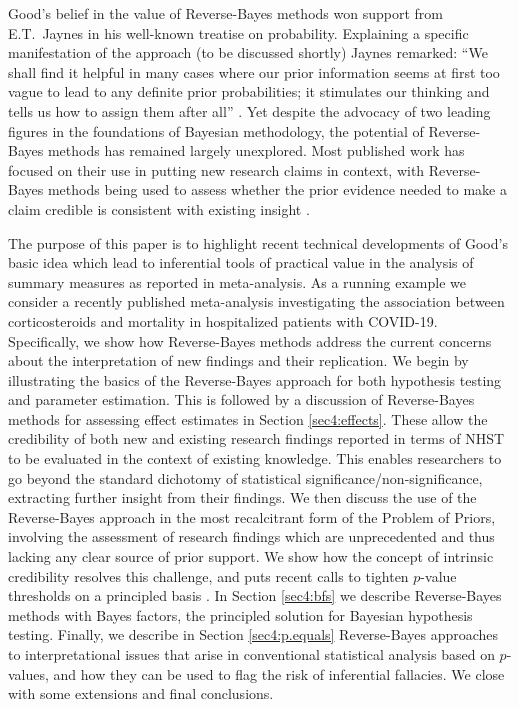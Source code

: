 Good's belief in the value of Reverse-Bayes methods won support from E.T.~Jaynes
in his well-known treatise on probability. Explaining a specific manifestation
of the approach (to be discussed shortly) Jaynes remarked: ``We shall find it
helpful in many cases where our prior information seems at first too vague to
lead to any definite prior probabilities; it stimulates our thinking and tells
us how to assign them after all'' \citep[p. 126]{Jaynes2003}. Yet despite the
advocacy of two leading figures in the foundations of Bayesian methodology, the
potential of Reverse-Bayes methods has remained largely unexplored. Most
published work has focused on their use in putting new research claims in
context, with Reverse-Bayes methods being used to assess whether the prior
evidence needed to make a claim credible is consistent with existing insight
\citep{Carlin1996,Matthews2001a,Matthews2001b,Spiegelhalter2004,Greenland2006,Greenland2011,Held2013,Colquhoun2017,Colquhoun2019,Held2019a,Held2020,Pawel2020b,
  Best2021}.


The purpose of this paper is to highlight recent technical developments of
Good's basic idea which lead to inferential tools of practical value in the
analysis of summary measures as reported in meta-analysis. As a running example
we consider a recently published meta-analysis investigating the association
between corticosteroids and mortality in hospitalized patients with COVID-19.
Specifically, we show how Reverse-Bayes methods address the current concerns
about the interpretation of new findings and their replication. We begin by
illustrating the basics of the Reverse-Bayes approach for both hypothesis
testing and parameter estimation. This is followed by a discussion of
Reverse-Bayes methods for assessing effect estimates in Section
\ref{sec4:effects}. These allow the credibility of both new and existing research
findings reported in terms of NHST to be evaluated in the context of existing
knowledge. This enables researchers to go beyond the standard dichotomy of
statistical significance/non-significance, extracting further insight from their
findings. We then discuss the use of the Reverse-Bayes approach in the most
recalcitrant form of the Problem of Priors, involving the assessment of research
findings which are unprecedented and thus lacking any clear source of prior
support. We show how the concept of intrinsic credibility resolves this
challenge, and puts recent calls to tighten $p$-value thresholds on a principled
basis \citep{Benjamin2017}. In Section \ref{sec4:bfs} we describe Reverse-Bayes
methods with Bayes factors, the principled solution for Bayesian hypothesis
testing. Finally, we describe in Section \ref{sec4:p.equals} Reverse-Bayes
approaches to interpretational issues that arise in conventional statistical
analysis based on $p$-values, and how they can be used to flag the risk of
inferential fallacies. We close with some extensions and final conclusions.



